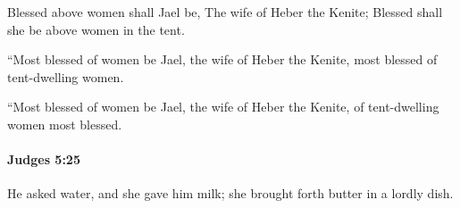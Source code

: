 			\begin{versebox}
					\item[BHS] 
					\item[ASV] Blessed above women shall Jael be, The wife of Heber the Kenite; Blessed shall she be above women in the tent.
					\item[NIV] “Most blessed of women be Jael, the wife of Heber the Kenite, most blessed of tent-dwelling women.
					\item[NRSV] “Most blessed of women be Jael, the wife of Heber the Kenite, of tent-dwelling women most blessed.
			\end{versebox}

		\paragraph{Judges 5:25} %
			\label{JUDGES-5-25}

			He asked water, and she gave him milk; she brought forth butter in a lordly dish.

